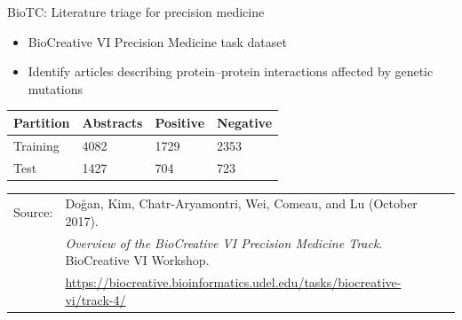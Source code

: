 \begin{frame}[t]{BioTC: Literature triage for precision medicine}


\small

\settowidth{\leftmargini}{7.}

\begin{itemize}

\item
BioCreative VI Precision Medicine task dataset

\item
Identify articles describing protein--protein interactions affected by genetic mutations

\end{itemize}

\medskip

\begin{center}
\begin{tabular}{D{16mm}G{20mm}G{20mm}G{20mm}}
Partition & Abstracts & Positive & Negative\\
\midrule
Training  & 4082 & 1729 & 2353\\
Test      & 1427 &  704 &  723\\
\end{tabular}
\end{center}

\vspace*{4mm}

\flushleft
\fontsize{5pt}{6pt}\selectfont
\begin{tabular}{@{}l@{\hskip2pt}l}
Source: & Doğan, Kim, Chatr-Aryamontri, Wei, Comeau, and Lu (October 2017).\\
& \textit{Overview of the BioCreative VI Precision Medicine Track}. BioCreative VI Workshop.\\
& \url{https://biocreative.bioinformatics.udel.edu/tasks/biocreative-vi/track-4/}
\end{tabular}

\end{frame}
